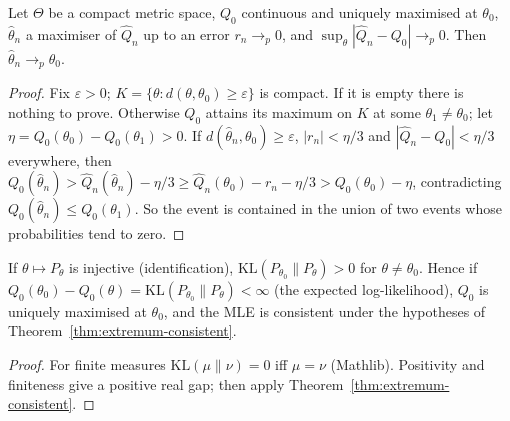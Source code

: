 \begin{theorem}
\label{thm:extremum-consistent}
\leanok
Let $\Theta$ be a compact metric space, $Q_0$ continuous and uniquely maximised at $\theta_0$, $\hat\theta_n$ a
maximiser of $\hat Q_n$ up to an error $r_n\to_p 0$, and $\sup_\theta|\hat Q_n - Q_0|\to_p 0$. Then
$\hat\theta_n\to_p\theta_0$.
\end{theorem}
\begin{proof}
\leanok
Fix $\varepsilon>0$; $K = \{\theta : d(\theta,\theta_0)\ge\varepsilon\}$ is compact. If it is empty there is nothing to
prove. Otherwise $Q_0$ attains its maximum on $K$ at some $\theta_1\ne\theta_0$; let
$\eta = Q_0(\theta_0) - Q_0(\theta_1)>0$. If $d(\hat\theta_n,\theta_0)\ge\varepsilon$, $|r_n|<\eta/3$ and
$|\hat Q_n - Q_0|<\eta/3$ everywhere, then
$Q_0(\hat\theta_n) > \hat Q_n(\hat\theta_n) - \eta/3 \ge \hat Q_n(\theta_0) - r_n - \eta/3 > Q_0(\theta_0) - \eta$,
contradicting $Q_0(\hat\theta_n)\le Q_0(\theta_1)$. So the event is contained in the union of two events whose
probabilities tend to zero.
\end{proof}

\begin{theorem}
\label{thm:mle-consistent}
\leanok
{}
If $\theta\mapsto P_\theta$ is injective (identification), $\mathrm{KL}(P_{\theta_0}\|P_\theta)>0$ for
$\theta\ne\theta_0$. Hence if $Q_0(\theta_0) - Q_0(\theta) = \mathrm{KL}(P_{\theta_0}\|P_\theta)<\infty$ (the expected
log-likelihood), $Q_0$ is uniquely maximised at $\theta_0$, and the MLE is consistent under the hypotheses of
Theorem~\ref{thm:extremum-consistent}.
\end{theorem}
\begin{proof}
\leanok
For finite measures $\mathrm{KL}(\mu\|\nu)=0$ iff $\mu=\nu$ (Mathlib). Positivity and finiteness give a positive real
gap; then apply Theorem~\ref{thm:extremum-consistent}.
\end{proof}

